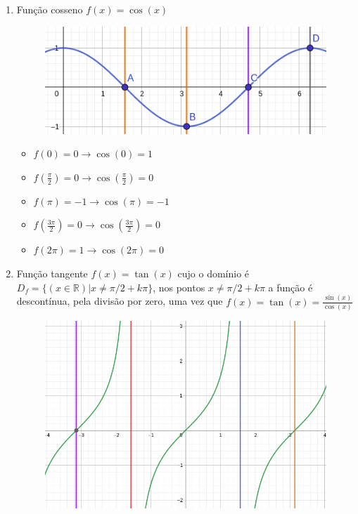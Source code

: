 \begin{multicols*}{2}
\begin{enumerate}
        \item Função cosseno $f(x) = \cos(x)$
              \begin{figure}[H]
                  \centering
                  \includegraphics[scale=0.35]{assets/rafael/img34.png}
              \end{figure}
              \begin{itemize}
                  \item $f(0) = 0 \rightarrow \cos(0) = 1 $
                  \item $f\left(\frac{\pi}{2} \right) = 0 \rightarrow \cos \left( \frac{\pi}{2} \right) = 0 $
                  \item $f(\pi) = -1 \rightarrow \cos(\pi) = -1$
                  \item $f\left( \frac{3 \pi}{2} \right) = 0 \rightarrow \cos \left( \frac{3 \pi}{2}\right) = 0$
                  \item $f(2 \pi) = 1 \rightarrow \cos(2 \pi) = 0$
              \end{itemize}

        \item Função tangente $f(x) = \tan(x)$ cujo o domínio é
              $D_f = \{(x \in \mathbb{R}) | x \ne \pi /2 + k\pi \}$, nos pontos $x \ne \pi /2 + k\pi$ a função é descontínua, pela divisão por zero, uma vez que $f(x) = \tan(x) = \frac{\sin(x)}{\cos(x)}$

              \begin{figure}[H]
                  \centering
                  \includegraphics[scale=0.3]{assets/rafael/img35.png}
              \end{figure}


\end{enumerate}
\end{multicols*}
